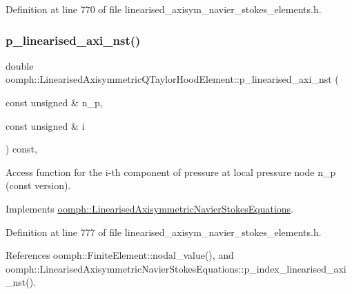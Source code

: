 Definition at line 770 of file linearised\+\_\+axisym\+\_\+navier\+\_\+stokes\+\_\+elements.\+h.

\mbox{\label{classoomph_1_1LinearisedAxisymmetricQTaylorHoodElement_a6b894b749efd765d1da22cb509b12b0f}} 
\subsubsection{\texorpdfstring{p\+\_\+linearised\+\_\+axi\+\_\+nst()}{p\_linearised\_axi\_nst()}}
{\footnotesize\ttfamily double oomph\+::\+Linearised\+Axisymmetric\+Q\+Taylor\+Hood\+Element\+::p\+\_\+linearised\+\_\+axi\+\_\+nst (\begin{DoxyParamCaption}\item[{const unsigned \&}]{n\+\_\+p,  }\item[{const unsigned \&}]{i }\end{DoxyParamCaption}) const\hspace{0.3cm}{\ttfamily [inline]}, {\ttfamily [virtual]}}



Access function for the i-\/th component of pressure at local pressure node n\+\_\+p (const version). 



Implements \hyperlink{classoomph_1_1LinearisedAxisymmetricNavierStokesEquations_aed0485a01052ffe2a5c9f36d6dd07da4}{oomph\+::\+Linearised\+Axisymmetric\+Navier\+Stokes\+Equations}.



Definition at line 777 of file linearised\+\_\+axisym\+\_\+navier\+\_\+stokes\+\_\+elements.\+h.



References oomph\+::\+Finite\+Element\+::nodal\+\_\+value(), and oomph\+::\+Linearised\+Axisymmetric\+Navier\+Stokes\+Equations\+::p\+\_\+index\+\_\+linearised\+\_\+axi\+\_\+nst().

\mbox{\label{classoomph_1_1LinearisedAxisymmetricQTaylorHoodElement_af3c9dcb0cf542f7cdd4fd21b1f6e3e64}} 
